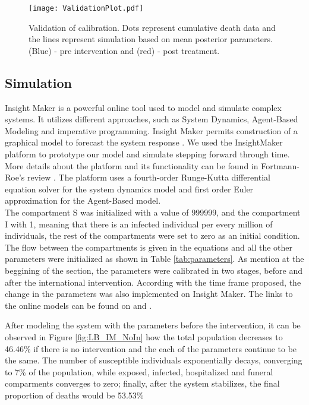 \begin{figure}[h]
  \centering
  \texttt{[image: ValidationPlot.pdf]}
  \caption{Validation of calibration. Dots represent cumulative death data and the lines represent simulation based on mean posterior parameters. (Blue) - pre intervention and (red) - post treatment.}
\label{fig:Cumulative _Death}
\end{figure}






\subsection{Simulation}
 Insight Maker is a powerful online tool used to model and simulate complex systems. It utilizes different approaches, such as System Dynamics, Agent-Based Modeling and imperative programming. Insight Maker permits  construction of a graphical model to forecast the system response \cite{FortmannRoe}. We used the InsightMaker platform to prototype our model and simulate stepping forward through time. More details about the platform and its functionality can be found in Fortmann-Roe's review \cite{FortmannRoe}. The platform uses a fourth-order Runge-Kutta differential equation solver for the system dynamics model and  first order Euler approximation for the Agent-Based model.\\

\noindent The compartment S was initialized with a value of 999999, and the compartment I with 1, meaning that there is an infected individual per every million of individuals, the rest of the compartments were set to zero as an initial condition. The flow between the compartments is given in the equations and all the other parameters were initialized as shown in Table \ref{tab:parameters}.  As mention at the beggining of the section, the parameters were calibrated in two stages, before and after the international intervention. According with the time frame proposed, the change in the parameters was also implemented on Insight Maker. The links to the online models can be found on \cite{IM_AI} and  \cite{IM_BI}.  


%
\noindent After modeling the system with the parameters before the intervention, it can be observed in Figure \ref{fig:LB_IM_NoIn} how the total population decreases to 46.46\%  if there is no intervention and the each of the parameters continue to be the same. The number of susceptible individuals exponentially decays, converging to 7\% of the population, while exposed, infected, hospitalized and funeral comparments converges to zero; finally, after the system stabilizes, the final proportion of deaths would be 53.53\% 

